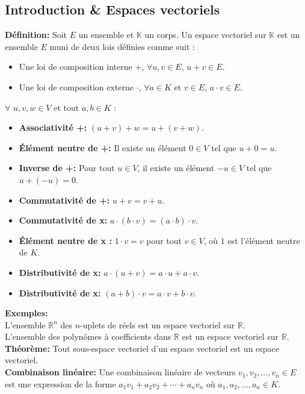 \subsection{Introduction \& Espaces vectoriels}


\textbf{Définition:}
Soit $E$ un ensemble et $\mathbb{K}$ un corps. Un espace vectoriel sur $\mathbb{K}$ est un ensemble $E$ muni de deux lois définies comme suit :
\begin{itemize}
    \item Une loi de composition interne $+$, $\forall u, v \in E$, $u + v \in E$.
    \item Une loi de composition externe $\cdot$, $\forall a \in K$ et $v \in E$, $a \cdot v \in E$.
\end{itemize}
$\forall$ $u, v, w \in V$ et tout $a, b \in K$ :
\begin{itemize}
    \item \textbf{Associativité +:} $(u + v) + w = u + (v + w)$.
    \item \textbf{Élément neutre de +:} Il existe un élément $0 \in V$ tel que $u + 0 = u$.
    \item \textbf{Inverse de +:} Pour tout $u \in V$, il existe un élément $-u \in V$ tel que $u + (-u) = 0$.
    \item \textbf{Commutativité de +:} $u + v = v + u$.
    \item \textbf{Commutativité de x:} $a \cdot (b \cdot v) = (a \cdot b) \cdot v$.
    \item \textbf{Élément neutre de x :} $1 \cdot v = v$ pour tout $v \in V$, où $1$ est l'élément neutre de $K$.
    \item \textbf{Distributivité de x:} $a \cdot (u + v) = a \cdot u + a \cdot v$.
    \item \textbf{Distributivité de x:} $(a + b) \cdot v = a \cdot v + b \cdot v$.
\end{itemize}

\textbf{Exemples:} \\
L'ensemble $\mathbb{R}^n$ des $n$-uplets de réels est un espace vectoriel sur $\mathbb{R}$.\\
L'ensemble des polynômes à coefficients dans $\mathbb{R}$ est un espace vectoriel sur $\mathbb{R}$.\\


\textbf{Théorème:}
Tout sous-espace vectoriel d'un espace vectoriel est un espace vectoriel. \\

\textbf{Combinaison linéaire:}
Une combinaison linéaire de vecteurs $v_1, v_2, \ldots, v_n \in E$ est une expression de la forme $a_1 v_1 + a_2 v_2 + \cdots + a_n v_n$ où $a_1, a_2, \ldots, a_n \in K$. \\

